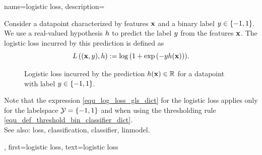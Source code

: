 {name={logistic loss}, 
	description={Consider 
		a \gls{datapoint} characterized by \glspl{feature} ${\bf x}$ and a 
		binary \gls{label} $y \in \{-1,1\}$. We use a real-valued \gls{hypothesis} 
		$h$ to predict the \gls{label} $y$ from the \glspl{feature} 
		${\bf x}$. The logistic \gls{loss} incurred by this \gls{prediction} is 
		defined as \cite{BishopBook}
		\begin{equation} 
			\label{equ_log_loss_gls_dict}
			L\left(({\bf x},y),h \right) :=  \log\, ( 1 + \exp\,(- y h({\bf x}))).
		\end{equation}
		\begin{figure}[H]
		\begin{center}
		\caption{Logistic \gls{loss} incurred by the \gls{prediction} $h({\bf x}) \in \mathbb{R}$ 
			for a \gls{datapoint} with \gls{label} $y \in \{-1,1\}$.}
			\label{fig_logloss_dict}
		\end{center}
		\end{figure}
		Note that the expression \eqref{equ_log_loss_gls_dict} 
		for the logistic \gls{loss} applies only for the \gls{labelspace} $\mathcal{Y} = \{ -1,1\}$ 
		and when using the thresholding rule \eqref{equ_def_threshold_bin_classifier_dict}. 
		\\
		See also: \gls{loss}, \gls{classification}, \gls{classifier}, \gls{linmodel}.},
	first={logistic loss},
	text={logistic loss}
}
	
